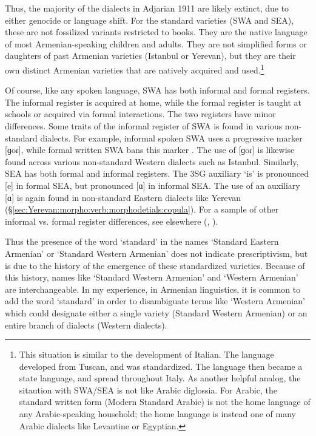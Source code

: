 Thus, the majority of the dialects in Adjarian 1911 are likely extinct, due to either genocide or language shift. For the standard varieties (SWA and SEA), these are not fossilized variants restricted to books. They are the native language of most Armenian-speaking children and adults. They are not simplified forms or daughters of past Armenian varieties (Istanbul or Yerevan), but they are their own distinct Armenian varieties that are natively acquired and used.\footnote{This situation is similar to the development of Italian. The language developed from Tuscan, and was standardized. The language then became a state language, and spread throughout Italy. As another helpful analog, the sitaution with SWA/SEA is not like Arabic diglossia. For Arabic, the standard written form (Modern Standard Arabic) is not the home language of any Arabic-speaking household; the home language is instead one of many Arabic dialects like Levantine or Egyptian. }





Of course, like any spoken language, SWA has both informal and formal registers. The informal register is acquired at home, while the formal register is taught at schools or acquired via formal interactions. The two registers have minor differences. Some traits of the informal register of SWA is found in various non-standard dialects. For example, informal spoken SWA uses a progressive marker [ɡoɾ], while formal written SWA bans this marker \citep{donabedian-2001-tabouLinguisticArmenianOccidentalGorProgressive}. The use of [ɡoɾ] is likewise found across various non-standard Western dialects such as Istanbul. Similarly, SEA has both formal and informal registers. The 3SG auxiliary `is' is pronounced [e] in formal SEA, but pronounced [ɑ] in informal SEA. The use of an auxiliary [ɑ] is again found in non-standard Eastern dialects like Yerevan (\S\ref{sec:Yerevan:morpho:verb:morphodetials:copula}). For a sample of other informal vs. formal register differences, see elsewhere (\citealt{Gharagyulyan-1981-ColloquialArmenian,Zakaryan-1981-ColloquialArmenian,Aghayan-1981-ColloquialArmenian,Kavassian-1983-CertainProblemMorphologyArmenianMontreal,DumTragut-2009-ArmenianReferenceGrammar}, \citealt[ch3]{Karapetian-2014-TeachArmenianEasternArmenianHeritage}).


Thus the presence of the word `standard' in the names `Standard Eastern Armenian' or `Standard Western Armenian' does not indicate prescriptivism, but is due to the history of the emergence of these standardized varieties. Because of this history, names like `Standard Western Armenian' and `Western Armenian' are interchangeable. In my experience, in Armenian linguistics, it is common to add the word `standard' in order to disambiguate terms like `Western Armenian' which could designate either a single variety (Standard Western Armenian) or an entire branch of dialects (Western dialects). 

